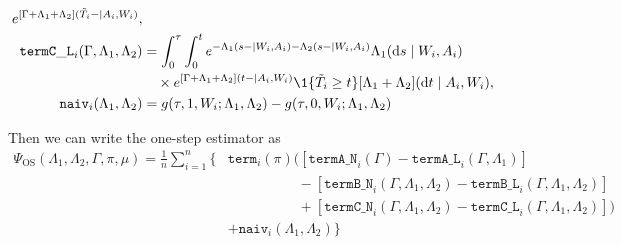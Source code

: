 \documentclass[a4,danish]{article}
\begin{document}
\begin{align*}
    e^{[\Gamma+\Lambda_1 + \Lambda_2](\tilde{T}_i- \mid A_i, W_i)},
  \\
  \mathtt{termC\_L}_i(\Gamma, \Lambda_1, \Lambda_2)
  & =    
    \int_0^{\tau}
    \int_0^{t}
    e^{-\Lambda_1(s- \mid W_i, A_i)-\Lambda_2(s- \mid W_i, A_i)}
    \Lambda_1(\diff s \mid W_i, A_i)
  \\
  & \quad \times
    e^{[\Gamma+\Lambda_1 + \Lambda_2](t- \mid A_i,
    W_i)}
    \1{\{\tilde{T}_i \geq t\}}
    [\Lambda_1+\Lambda_2](\diff t \mid A_i, W_i),
  \\
  \mathtt{naiv}_i(\Lambda_1,\Lambda_2)
  & =
    g(\tau, 1, W_i; \Lambda_1, \Lambda_2)
    - g(\tau, 0, W_i; \Lambda_1, \Lambda_2)
\end{align*}

Then we can write the one-step estimator as
\begin{align*}
  \Psi_{\text{OS}}(\Lambda_1, \Lambda_2, \Gamma, \pi, \mu)
  = \frac{1}{n}\sum_{i=1}^{n}
  \Bigg\{
  & 
    \mathtt{term}_i(\pi)
    \Big(
    \left[
    \mathtt{termA\_N}_i(\Gamma) - \mathtt{termA\_L}_i(\Gamma, \Lambda_1)
    \right]
  \\
  & \quad\qquad\qquad - 
          \left[
          \mathtt{termB\_N}_i(\Gamma, \Lambda_1, \Lambda_2)
          - \mathtt{termB\_L}_i(\Gamma, \Lambda_1, \Lambda_2)
          \right]
  \\
  & \quad\qquad\qquad+ 
    \left[
    \mathtt{termC\_N}_i(\Gamma, \Lambda_1, \Lambda_2)
    - \mathtt{termC\_L}_i(\Gamma, \Lambda_1, \Lambda_2)
    \right] \Big)
  \\
  & + \mathtt{naiv}_i(\Lambda_1,\Lambda_2)
    \Bigg\}
\end{align*}
\end{document}
